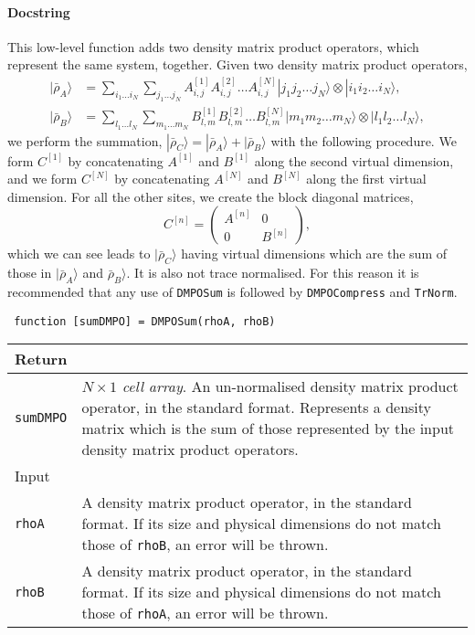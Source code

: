  \paragraph{Docstring} This low-level function adds two density matrix product operators, which represent the same system, together. Given two density matrix product operators, 
 \begin{align}
 |\bar{\rho}_{A} \rangle &= \sum_{i_{1}\ldots i_{N}} \sum_{j_{1} \ldots j_{N}} A^{[1]}_{i,j} A^{[2]}_{i,j} \ldots A^{[N]}_{i,j} |j_{1} j_{2} \ldots j_{N} \rangle \otimes |i_{1} i_{2} \ldots i_{N} \rangle, \label{eq:vs3-5} \\
 |\bar{\rho}_{B} \rangle &= \sum_{l_{1} \ldots l_{N}} \sum_{m_{1} \ldots m_{N}} B^{[1]}_{l,m} B^{[2]}_{l,m} \ldots B^{[N]}_{l,m} |m_{1} m_{2} \ldots m_{N} \rangle \otimes |l_{1} l_{2} \ldots l_{N} \rangle, \label{eq:vs3-6} 
 \end{align}
 we perform the summation, \(|\bar{\rho}_{C} \rangle = |\bar{\rho}_{A} \rangle + |\bar{\rho}_{B} \rangle\) with the following procedure. We form \(C^{[1]}\) by concatenating \(A^{[1]}\) and \(B^{[1]}\) along the second virtual dimension, and we form \(C^{[N]}\) by concatenating \(A^{[N]}\) and \(B^{[N]}\) along the first virtual dimension. For all the other sites, we create the block diagonal matrices,
 \begin{equation}
 C^{[n]} = \begin{pmatrix}
 A^{[n]} & 0 \\ 
 0 & B^{[n]} \end{pmatrix}, 
 \label{eq:vs3-7}
 \end{equation}
 which we can see leads to \(|\bar{\rho}_{C} \rangle \) having virtual dimensions which are the sum of those in \(|\bar{\rho}_{A}\rangle\) and \(\bar{\rho}_{B}\rangle\). It is also not trace normalised. For this reason it is recommended that any use of \lstinline$DMPOSum$ is followed by \lstinline$DMPOCompress$ and \lstinline$TrNorm$. 
 \begin{lstlisting}
 function [sumDMPO] = DMPOSum(rhoA, rhoB) \end{lstlisting}
 \begin{longtabu}{X[1,l]X[4,l]}
 \hline
 Return & \\ \hline
 \lstinline$sumDMPO$ & \emph{\(N \times 1\) cell array}. An un-normalised density matrix product operator, in the standard format. Represents a density matrix which is the sum of those represented by the input density matrix product operators. \\ \hline
 Input & \\ \hline
 \lstinline$rhoA$ & A density matrix product operator, in the standard format. If its size and physical dimensions do not match those of \lstinline$rhoB$, an error will be thrown. \\ 
 \lstinline$rhoB$ & A density matrix product operator, in the standard format. If its size and physical dimensions do not match those of \lstinline$rhoA$, an error will be thrown. \\ 
 \hline
 \end{longtabu}
